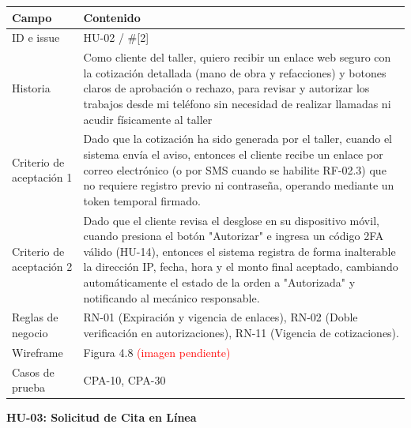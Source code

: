 {\def\LTcaptype{none} %
\begin{longtable}[]{@{}
  >{\raggedright\arraybackslash}p{}
  >{\raggedright\arraybackslash}p{}@{}}
\toprule\noalign{}
\begin{minipage}[b]{\linewidth}\raggedright
\textbf{Campo}
\end{minipage} & \begin{minipage}[b]{\linewidth}\raggedright
\textbf{Contenido}
\end{minipage} \\
\midrule\noalign{}
\endhead
\bottomrule\noalign{}
\endlastfoot
ID e issue & HU-02 / \#{[}2{]} \\
Historia & Como cliente del taller, quiero recibir un enlace web seguro
con la cotización detallada (mano de obra y refacciones) y botones
claros de aprobación o rechazo, para revisar y autorizar los trabajos
desde mi teléfono sin necesidad de realizar llamadas ni acudir
físicamente al taller \\
Criterio de aceptación 1 & Dado que la cotización ha sido generada por
el taller, cuando el sistema envía el aviso, entonces el cliente recibe
un enlace por correo electrónico (o por SMS cuando se habilite RF-02.3)
que no requiere registro previo ni contraseña, operando mediante un
token temporal firmado. \\
Criterio de aceptación 2 & Dado que el cliente revisa el desglose en su
dispositivo móvil, cuando presiona el botón "Autorizar" e ingresa un
código 2FA válido (HU-14), entonces el sistema registra de forma
inalterable la dirección IP, fecha, hora y el monto final aceptado,
cambiando automáticamente el estado de la orden a "Autorizada" y
notificando al mecánico responsable. \\
Reglas de negocio & RN-01 (Expiración y vigencia de enlaces), RN-02
(Doble verificación en autorizaciones), RN-11 (Vigencia de
cotizaciones). \\
Wireframe & Figura 4.8 \textcolor{red}{(imagen pendiente)} \\
Casos de prueba & CPA-10, CPA-30 \\
\end{longtable}
}

\textbf{HU-03: Solicitud de Cita en Línea}

